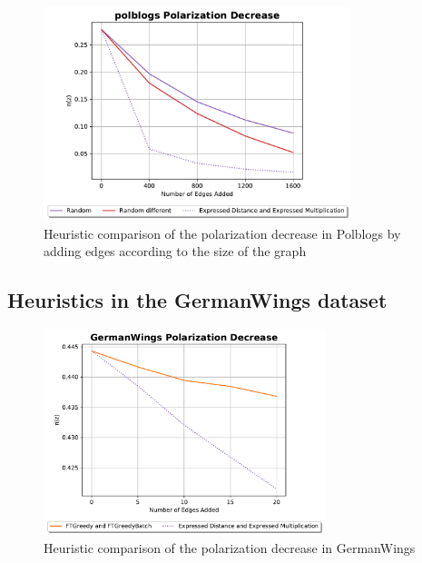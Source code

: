 \begin{figure}[!htbp]
	\centering
	\captionsetup{justification=centering,margin=2cm}
	\includegraphics[width=0.8\textwidth]{Figures/polblogs Polarization Decrease big}
	\caption{Heuristic comparison of the polarization decrease in Polblogs by adding edges according to the size of the graph }
	\label{fig:polblogs_big_pol}
\end{figure}

\clearpage

\subsection{Heuristics in the GermanWings dataset}

\begin{figure}[!htbp]
	\centering
	\captionsetup{justification=centering,margin=2cm}
	\includegraphics[width=0.73\textwidth]{Figures/GermanWings Polarization Decrease}
	\caption{Heuristic comparison of the polarization decrease in GermanWings}
	\label{fig:GermanWings_pol}
\end{figure}


